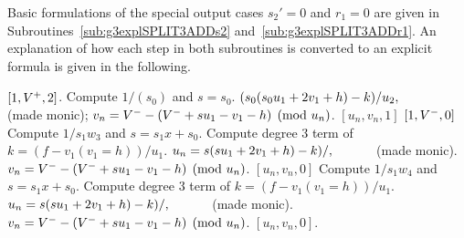 Basic formulations of the special output cases $s_2' = 0$ and $r_1 = 0$ are given
in Subroutines~\ref{sub:g3explSPLIT3ADDs2} and~\ref{sub:g3explSPLIT3ADDr1}. An
explanation of how each step in both subroutines is converted to an explicit
formula is given in the following.

\begin{subroutine}
\caption{Genus 3 Split Model Degree 3 Addition $s_2' = 0$ \label{sub:g3explSPLIT3ADDs2}}
\begin{algorithmic} [1]
     \Return $[1,V^{+},2]$.
    \Else
        \State Compute $1/(s_0)$ and $s = s_0$.
        \State $(s_0(s_0u_1 + 2v_1 + h) - k)/u_2, \quad\quad\quad$ (made monic);
        \State $v_n = V^{-} - (V^{-} + su_1 - v_1 - h) \pmod{u_n}$.
        \State \Return $[u_n,v_n,1]$
    \EndIf
\EndIf
{}
     \Return $[1,V^{-},0]$
    \Else
        \State Compute $1/s_1w_3$ and $s = s_1x + s_0$.
        \State Compute degree 3 term of $k = (f-v_1(v_1 = h))/u_1$.
        \State $u_n = s(su_1 + 2v_1 + h) - k)/, \quad\quad\quad $ (made monic).
        \State $v_n = V^{-} - (V^{-} + su_1 - v_1 - h) \pmod{u_n}$.
        \State \Return $[u_n,v_n,0]$
    \EndIf
\EndIf
\State Compute $1/s_1w_4$ and $s = s_1x + s_0$.
\State Compute degree 3 term of $k = (f-v_1(v_1 = h))/u_1$.
\State $u_n = s(su_1 + 2v_1 + h) - k)/, \quad\quad\quad $ (made monic).
\State $v_n = V^{-} - (V^{-} + su_1 - v_1 - h) \pmod{u_n}$.
\State \Return $[u_n,v_n,0]$.
\end{algorithmic}
\end{subroutine}

